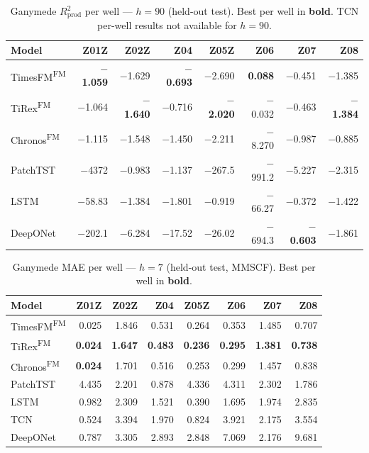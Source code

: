\documentclass[11pt]{article}
\newcommand{\best}[1]{\textbf{#1}}
\newcommand{\fm}{\textsuperscript{FM}}
\newcommand{\rp}{R^2_\text{prod}}
\begin{document}
\begin{table}[ht]
\centering
\caption{Ganymede $\rp$ per well — $h{=}90$ (held-out test). Best per well in \textbf{bold}.
TCN per-well results not available for $h{=}90$.}
\label{tab:perwell_r2p_h90}
\scriptsize
\setlength{\tabcolsep}{2.5pt}
\begin{tabular}{@{}l rrrrrrr @{}}
\toprule
\textbf{Model} & \textbf{Z01Z} & \textbf{Z02Z} & \textbf{Z04} & \textbf{Z05Z} & \textbf{Z06} & \textbf{Z07} & \textbf{Z08} \\
\midrule
TimesFM\fm  & \best{$-$1.059} & $-$1.629 & \best{$-$0.693} & $-$2.690 & \best{0.088} & $-$0.451 & $-$1.385 \\
TiRex\fm    & $-$1.064 & \best{$-$1.640} & $-$0.716 & \best{$-$2.020} & $-$0.032 & $-$0.463 & \best{$-$1.384} \\
Chronos\fm  & $-$1.115 & $-$1.548 & $-$1.450 & $-$2.211 & $-$8.270 & $-$0.987 & $-$0.885 \\
PatchTST    & $-$4372 & $-$0.983 & $-$1.137 & $-$267.5 & $-$991.2 & $-$5.227 & $-$2.315 \\
LSTM        & $-$58.83 & $-$1.384 & $-$1.801 & $-$0.919 & $-$66.27 & $-$0.372 & $-$1.422 \\
DeepONet    & $-$202.1 & $-$6.284 & $-$17.52 & $-$26.02 & $-$694.3 & \best{$-$0.603} & $-$1.861 \\
\bottomrule
\end{tabular}
\end{table}


\newpage
\begin{table}[ht]
\centering
\caption{Ganymede MAE per well — $h{=}7$ (held-out test, MMSCF). Best per well in \textbf{bold}.}
\label{tab:perwell_mae_h7}
\scriptsize
\setlength{\tabcolsep}{2.5pt}
\begin{tabular}{@{}l rrrrrrr @{}}
\toprule
\textbf{Model} & \textbf{Z01Z} & \textbf{Z02Z} & \textbf{Z04} & \textbf{Z05Z} & \textbf{Z06} & \textbf{Z07} & \textbf{Z08} \\
\midrule
TimesFM\fm  & 0.025 & 1.846 & 0.531 & 0.264 & 0.353 & 1.485 & 0.707 \\
TiRex\fm    & \best{0.024} & \best{1.647} & \best{0.483} & \best{0.236} & \best{0.295} & \best{1.381} & \best{0.738} \\
Chronos\fm  & \best{0.024} & 1.701 & 0.516 & 0.253 & 0.299 & 1.457 & 0.838 \\
PatchTST    & 4.435 & 2.201 & 0.878 & 4.336 & 4.311 & 2.302 & 1.786 \\
LSTM        & 0.982 & 2.309 & 1.521 & 0.390 & 1.695 & 1.974 & 2.835 \\
TCN         & 0.524 & 3.394 & 1.970 & 0.824 & 3.921 & 2.175 & 3.554 \\
DeepONet    & 0.787 & 3.305 & 2.893 & 2.848 & 7.069 & 2.176 & 9.681 \\
\bottomrule
\end{tabular}
\end{table}
\end{document}
